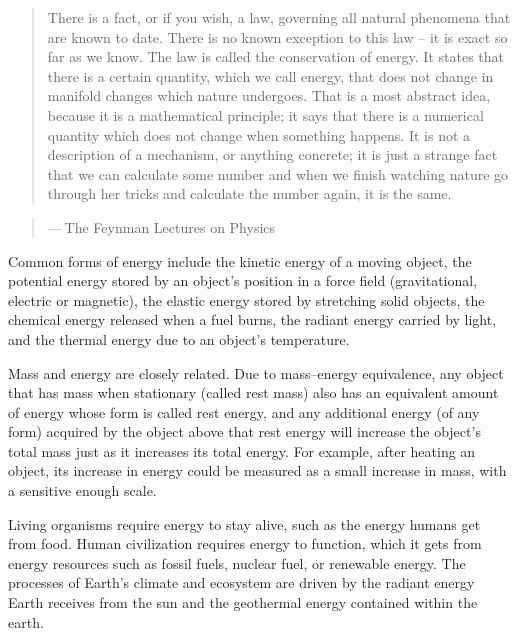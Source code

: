 \documentclass[
]{book}
\begin{document}
\begin{quote}
There is a fact, or if you wish, a law, governing all natural phenomena that are known to date. There is no known exception to this law -- it is exact so far as we know. The law is called the conservation of energy. It states that there is a certain quantity, which we call energy, that does not change in manifold changes which nature undergoes. That is a most abstract idea, because it is a mathematical principle; it says that there is a numerical quantity which does not change when something happens. It is not a description of a mechanism, or anything concrete; it is just a strange fact that we can calculate some number and when we finish watching nature go through her tricks and calculate the number again, it is the same.
\end{quote}

\begin{quote}
--- The Feynman Lectures on Physics
\end{quote}

Common forms of energy include the kinetic energy of a moving object, the potential energy stored by an object's position in a force field (gravitational, electric or magnetic), the elastic energy stored by stretching solid objects, the chemical energy released when a fuel burns, the radiant energy carried by light, and the thermal energy due to an object's temperature.

Mass and energy are closely related. Due to mass--energy equivalence, any object that has mass when stationary (called rest mass) also has an equivalent amount of energy whose form is called rest energy, and any additional energy (of any form) acquired by the object above that rest energy will increase the object's total mass just as it increases its total energy. For example, after heating an object, its increase in energy could be measured as a small increase in mass, with a sensitive enough scale.

Living organisms require energy to stay alive, such as the energy humans get from food. Human civilization requires energy to function, which it gets from energy resources such as fossil fuels, nuclear fuel, or renewable energy. The processes of Earth's climate and ecosystem are driven by the radiant energy Earth receives from the sun and the geothermal energy contained within the earth.
\end{document}
